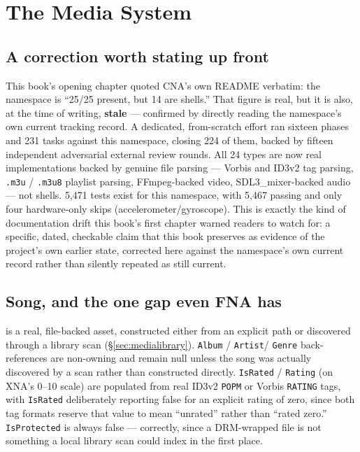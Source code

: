 \chapter{The Media System}
\label{ch:media-system}

\section{A correction worth stating up front}

This book's opening chapter quoted CNA's own README verbatim: the  namespace is
``25/25 present, but 14 are shells.'' That figure is real, but it is also, at the time of
writing, \textbf{stale} --- confirmed by directly reading the namespace's own current
tracking record. A dedicated, from-scratch effort ran sixteen phases and 231 tasks against
this namespace, closing 224 of them, backed by fifteen independent adversarial external
review rounds. All 24  types are now real implementations backed by genuine file
parsing --- Vorbis and ID3v2 tag parsing, \texttt{.m3u} / \texttt{.m3u8} playlist parsing,
FFmpeg-backed video, SDL3\_mixer-backed audio --- not shells. 5{,}471 tests exist for this
namespace, with 5{,}467 passing and only four hardware-only skips (accelerometer/gyroscope).
This is exactly the kind of documentation drift this book's first chapter warned readers to
watch for: a specific, dated, checkable claim that this book preserves as evidence of the
project's own earlier state, corrected here against the namespace's own current record rather
than silently repeated as still current.

\section{Song, and the one gap even FNA has}

 is a real, file-backed asset, constructed either from an explicit path or
discovered through a library scan (\S\ref{sec:medialibrary}). \texttt{Album} / \texttt{Artist}/%
\texttt{Genre} back-references are non-owning and remain null unless the song was actually
discovered by a scan rather than constructed directly. \texttt{IsRated} / \texttt{Rating}
(on XNA's 0--10 scale) are populated from real ID3v2 \texttt{POPM} or Vorbis \texttt{RATING}
tags, with \texttt{IsRated} deliberately reporting false for an explicit rating of zero,
since both tag formats reserve that value to mean ``unrated'' rather than ``rated zero.''
\texttt{IsProtected} is always false --- correctly, since a DRM-wrapped file is not something
a local library scan could index in the first place.

